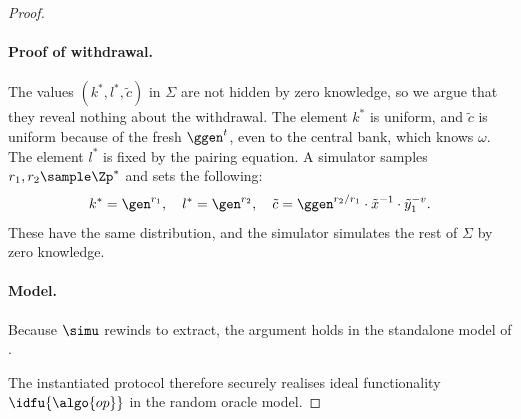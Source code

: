 \begin{proof}
\paragraph{Proof of withdrawal.} The values $(k^*, l^*, \tilde{c})$ in $\Sigma$
are not hidden by zero knowledge, so we argue that they reveal nothing about the
withdrawal. The element $k^*$ is uniform, and $\tilde{c}$ is uniform because of
the fresh $\ggen^{t}$, even to the central bank, which knows $\omega$. The
element $l^*$ is fixed by the pairing equation. A simulator samples $r_1, r_2 \sample \Zp^*$ and sets the following:
%
\begin{equation*}
%
  k^* = \gen^{r_1}, \quad l^* = \gen^{r_2}, \quad \tilde{c} = \ggen^{r_2/r_1} \cdot
\tilde{x}^{-1} \cdot \tilde{y}_1^{-v}.
%
\end{equation*}
%
These have the same distribution, and the simulator simulates the rest of $\Sigma$ by zero
knowledge.

\paragraph{Model.} Because $\simu$ rewinds to extract, the argument holds in the
standalone model of .

The instantiated protocol therefore securely realises ideal functionality
$\idfu{\algo{op}}$ in the random oracle model.

\end{proof}
